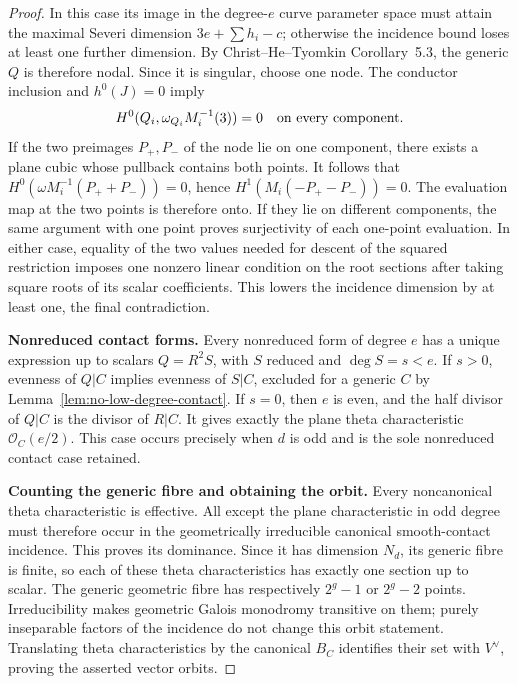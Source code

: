 \begin{proof}
In this case its image in the degree-$e$ curve parameter space
must attain the maximal Severi dimension
$3e+\sum h_i-c$; otherwise the incidence bound loses at least
one further dimension.  By Christ--He--Tyomkin Corollary~5.3,
the generic $Q$ is therefore nodal.  Since it is singular, choose
one node.  The conductor inclusion and $h^0(J)=0$ imply
\[
 H^0(Q_i,\omega_{Q_i}M_i^{-1}(3))=0
 \quad\hbox{on every component}.
\]
If the two preimages $P_+,P_-$ of the node lie on one component,
there exists a plane cubic whose pullback contains both points.
It follows that
$H^0(\omega M_i^{-1}(P_++P_-))=0$, hence
$H^1(M_i(-P_+-P_-))=0$.  The evaluation map at the two points
is therefore onto.  If they lie on different components, the
same argument with one point proves surjectivity of each
one-point evaluation.  In either case, equality of the two values
needed for descent of the squared restriction imposes one
nonzero linear condition on the root sections after taking square
roots of its scalar coefficients.  This lowers the incidence
dimension by at least one, the final contradiction.

\par\smallskip\noindent\textbf{Nonreduced contact forms.}
Every nonreduced form of degree $e$ has a unique expression up to
scalars $Q=R^2S$, with $S$ reduced and $\deg S=s<e$.
If $s>0$, evenness of $Q|C$ implies evenness of $S|C$, excluded
for a generic $C$ by Lemma~\ref{lem:no-low-degree-contact}.
If $s=0$, then $e$ is even, and the half divisor of $Q|C$ is
the divisor of $R|C$.  It gives exactly the plane theta
characteristic $\mathcal O_C(e/2)$.  This case occurs precisely
when $d$ is odd and is the sole nonreduced contact case retained.

\par\smallskip\noindent\textbf{Counting the generic fibre and obtaining the orbit.}
Every noncanonical theta characteristic is effective.
All except the plane characteristic in odd degree must therefore
occur in the geometrically irreducible canonical smooth-contact
incidence.  This proves its dominance.  Since it has dimension
$N_d$, its generic fibre is finite, so each of these theta
characteristics has exactly one section up to scalar.
The generic geometric fibre has respectively $2^g-1$ or
$2^g-2$ points.  Irreducibility makes geometric Galois monodromy
transitive on them; purely inseparable factors of the incidence
do not change this orbit statement.  Translating theta
characteristics by the canonical $B_C$ identifies their set
with $V^\vee$, proving the asserted vector orbits.
\end{proof}


